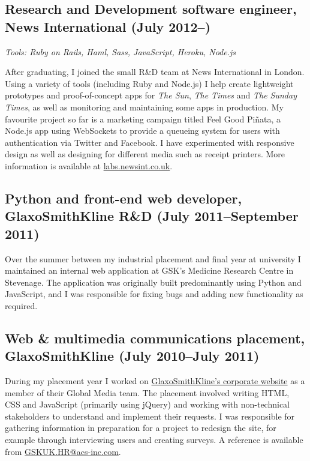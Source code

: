 \documentclass[10pt,a4paper]{article}
\begin{document}

\subsection*{Research and Development software engineer, News International (July 2012--)}

\emph{Tools: Ruby on Rails, Haml, Sass, JavaScript, Heroku, Node.js}

After graduating, I joined the small R\&D team at News International in
London. Using a variety of tools (including Ruby and Node.js) I help create
lightweight prototypes and proof-of-concept apps for \emph{The Sun}, \emph{The
Times} and \emph{The Sunday Times}, as well as monitoring and maintaining some
apps in production. My favourite project so far is a marketing campaign titled Feel
Good Piñata, a Node.js app using WebSockets to provide a queueing system for
users with authentication via Twitter and Facebook. I have experimented with
responsive design as well as designing for different media such as receipt
printers. More information is available at
\href{http://labs.newsint.co.uk/}{labs.newsint.co.uk}.

\subsection*{Python and front-end web developer, GlaxoSmithKline R\&D (July 2011--September 2011)}

Over the summer between my industrial placement and final year at university I
maintained an internal web application at GSK's Medicine Research Centre in
Stevenage. The application was originally built predominantly using Python and
JavaScript, and I was responsible for fixing bugs and adding new functionality
as required.

\subsection*{Web \& multimedia communications placement, GlaxoSmithKline (July 2010--July 2011)}

During my placement year I worked on
\href{http://www.gsk.com/}{GlaxoSmithKline's corporate website} as a member of
their Global Media team. The placement involved writing HTML, CSS and
JavaScript (primarily using jQuery) and working with non-technical
stakeholders to understand and implement their requests. I was responsible for
gathering information in preparation for a project to redesign the site, for
example through interviewing users and creating surveys. A reference is
available from \href{mailto:GSKUK.HR@acs-inc.com}{\mbox{GSKUK.HR@acs-inc.com}}.
\end{document}
